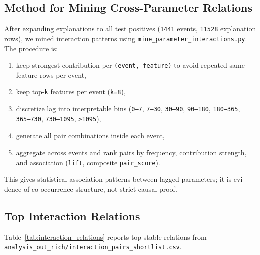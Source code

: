 \documentclass[12pt,a4paper]{article}
\begin{document}
\begin{latin}
\subsection{Method for Mining Cross-Parameter Relations}
After expanding explanations to all test positives (\texttt{1441} events, \texttt{11528} explanation rows), we mined interaction patterns using \texttt{mine\_parameter\_interactions.py}.
The procedure is:
\begin{enumerate}
\item keep strongest contribution per \texttt{(event, feature)} to avoid repeated same-feature rows per event,
\item keep top-\texttt{k} features per event (\texttt{k=8}),
\item discretize lag into interpretable bins (\texttt{0--7}, \texttt{7--30}, \texttt{30--90}, \texttt{90--180}, \texttt{180--365}, \texttt{365--730}, \texttt{730--1095}, \texttt{>1095}),
\item generate all pair combinations inside each event,
\item aggregate across events and rank pairs by frequency, contribution strength, and association (\texttt{lift}, composite \texttt{pair\_score}).
\end{enumerate}

This gives statistical association patterns between lagged parameters; it is evidence of co-occurrence structure, not strict causal proof.

\subsection{Top Interaction Relations}
Table~\ref{tab:interaction_relations} reports top stable relations from \texttt{analysis\_out\_rich/interaction\_pairs\_shortlist.csv}.


\end{latin}
\end{document}
